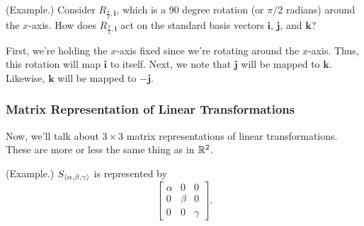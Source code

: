\documentclass[letterpaper]{article}
\begin{document}
\begin{mdframed}[]
    (Example.) Consider $R_{\frac{\pi}{2}, \mathbf{i}}$, which is a 90 degree rotation (or $\pi / 2$ radians) around the $x$-axis. How does $R_{\frac{\pi}{2}, \mathbf{i}}$ act on the standard basis vectors $\mathbf{i}$, $\mathbf{j}$, and $\mathbf{k}$?

    \begin{mdframed}[]
        First, we're holding the $x$-axis fixed since we're rotating around the $x$-axis. Thus, this rotation will map $\mathbf{i}$ to itself. Next, we note that $\mathbf{j}$ will be mapped to $\mathbf{k}$. Likewise, $\mathbf{k}$ will be mapped to $-\mathbf{j}$.
    \end{mdframed}
\end{mdframed}

\subsubsection{Matrix Representation of Linear Transformations}
Now, we'll talk about $3 \times 3$ matrix representations of linear transformations. These are more or less the same thing as in $\mathbb{R}^2$. 

\begin{mdframed}[]
    (Example.) $S_{\langle \alpha, \beta, \gamma \rangle}$ is represented by 
    \[\begin{bmatrix}
        \alpha & 0 & 0 \\ 
        0 & \beta & 0 \\ 
        0 & 0 & \gamma
    \end{bmatrix}.\]
\end{mdframed}
\end{document}
